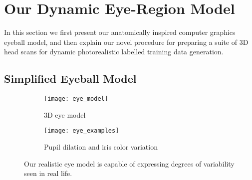 
\section{Our Dynamic Eye-Region Model}




In this section we first present our anatomically inspired computer graphics eyeball model, and then explain our novel procedure for preparing a suite of 3D head scans for dynamic photorealistic labelled training data generation.

\subsection{Simplified Eyeball Model}
\label{subsec:eyeball_model}

\begin{figure}
    \centering
    \begin{subfigure}[t]{0.33\columnwidth}
        \texttt{[image: eye\_model]}
        \caption{3D eye model}
        \label{fig:3d_eye_model}
    \end{subfigure}%
    \hfill
    \begin{subfigure}[t]{0.65\columnwidth}
        \texttt{[image: eye\_examples]}
        \caption{Pupil dilation and iris color variation}
    \end{subfigure}
    \caption{Our realistic eye model is capable of expressing degrees of variability seen in real life.}
    \label{fig:eye_model}
\end{figure}


